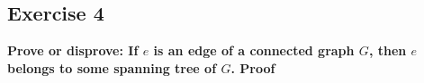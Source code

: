 \subsection*{Exercise 4}
\boldmath
\textbf{Prove or disprove: If $e$ is an edge of a connected graph $G$, then $e$ belongs to some spanning tree
of $G$.\spacer 
Proof}
\unboldmath

